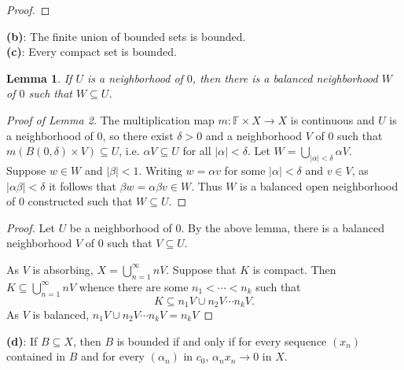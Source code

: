 \documentclass[12pt,letterpaper]{scrartcl}
\newcommand{\sub}{\subseteq}
\newcommand{\F}{\mathbb{F}}
\theoremstyle{mystyle}
\theoremstyle{plain}
\newtheorem{lemma}{Lemma}[]
\theoremstyle{remark}
\begin{document}
  \begin{proof}


  \end{proof}

  \textbf{(b)}: The finite union of bounded sets is bounded.\\

  \textbf{(c)}: Every compact set is bounded.

  \begin{lemma}
    If $U$ is a neighborhood of $0$, then there is a balanced neighborhood $W$ of $0$ such that $W\sub U$.
  \end{lemma}

  \begin{proof}[Proof of Lemma 2]
    The multiplication map $m:\F\times X\to X$ is continuous and $U$ is a neighborhood of $0$, so there exist $\delta>0$ and a neighborhood $V$ of 0 such that $m(B(0, \delta) \times V) \sub U$, i.e. $\alpha V\sub U$ for all $|\alpha|<\delta$. Let $W = \bigcup_{|\alpha|<\delta}\alpha V$. \\

    Suppose $w\in W$ and $|\beta|<1$. Writing $w = \alpha v$ for some $|\alpha|<\delta$ and $v\in V$, as $|\alpha\beta|<\delta$ it follows that $\beta w = \alpha\beta v \in W$. Thus $W$ is a balanced open neighborhood of $0$ constructed such that $W\sub U$.
  \end{proof}

  \begin{proof}
    Let $U$ be a neighborhood of $0$. By the above lemma, there is a balanced neighborhood $V$ of $0$ such that $V\sub U$.

    As $V$ is absorbing, $X = \bigcup_{n=1}^{\infty}nV$. Suppose that $K$ is compact. Then $K\sub \bigcup_{n=1}^{\infty}nV$ whence there are some $n_1<\cdots<n_k$ such that
    \[
      K\sub n_1 V\cup n_2 V \cdots n_k V.
    \]
    As $V$ is balanced, $n_1 V\cup n_2 V \cdots n_k V = n_k V$
  \end{proof}

  \textbf{(d)}: If $B\sub X$, then $B$ is bounded if and only if for every sequence $(x_n)$ contained in $B$ and for every $(\alpha_n)$ in $c_0$, $\alpha_n x_n\to 0$ in $X$.
\end{document}
